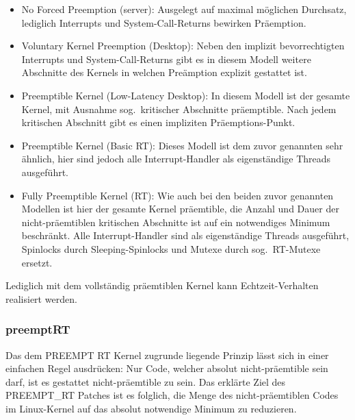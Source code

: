 \begin{itemize}
  \item No Forced Preemption (server):
  Ausgelegt auf maximal möglichen Durchsatz, lediglich Interrupts und
  System-Call-Returns bewirken Präemption.

  \item Voluntary Kernel Preemption (Desktop):
  Neben den implizit bevorrechtigten Interrupts und System-Call-Returns gibt es
  in diesem Modell weitere Abschnitte des Kernels in welchen Preämption explizit
  gestattet ist.

  \item Preemptible Kernel (Low-Latency Desktop):
  In diesem Modell ist der gesamte Kernel, mit Ausnahme sog.~kritischer Abschnitte
  präemptible. Nach jedem kritischen Abschnitt gibt es einen impliziten Präemptions-Punkt.

  \item Preemptible Kernel (Basic RT):
  Dieses Modell ist dem zuvor genannten sehr ähnlich, hier sind jedoch alle Interrupt-Handler
  als eigenständige Threads ausgeführt.

  \item Fully Preemptible Kernel (RT):
  Wie auch bei den beiden zuvor genannten Modellen ist hier der gesamte Kernel
  präemtible, die Anzahl und Dauer der nicht-präemtiblen kritischen Abschnitte
  ist auf ein notwendiges Minimum beschränkt. Alle Interrupt-Handler sind als
  eigenständige Threads ausgeführt, Spinlocks durch Sleeping-Spinlocks und Mutexe
  durch sog.~RT-Mutexe ersetzt.

\end{itemize}

Lediglich mit dem vollständig präemtiblen Kernel kann Echtzeit-Verhalten realisiert werden.


\subsubsection{preemptRT%
        \label{sec:2-preemptRT}}

Das dem PREEMPT RT Kernel zugrunde liegende Prinzip lässt sich in einer einfachen
Regel ausdrücken: Nur Code, welcher absolut nicht-präemtible sein darf, ist es
gestattet nicht-präemtible zu sein.
Das erklärte Ziel des PREEMPT\_RT Patches ist es folglich, die Menge des nicht-präemtiblen
Codes im Linux-Kernel auf das absolut notwendige Minimum zu reduzieren.

